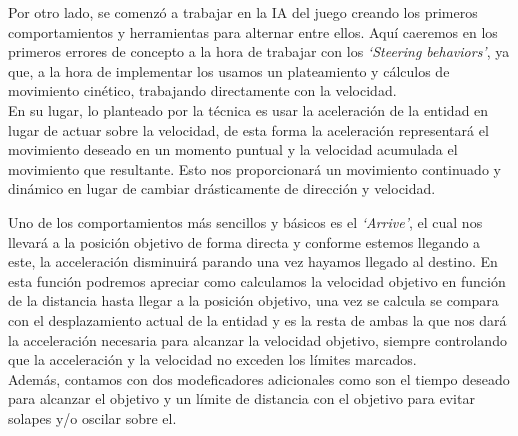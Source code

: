 Por otro lado, se comenzó a trabajar en la \ac{IA} del juego creando los primeros comportamientos
y herramientas para alternar entre ellos. Aquí caeremos en los primeros errores de concepto a la
hora de trabajar con los \textit{`Steering behaviors'}, ya que, a la hora de implementar los
usamos un plateamiento y cálculos de movimiento cinético, trabajando directamente con la 
velocidad.\\
En su lugar, lo planteado por la técnica es usar la aceleración de la entidad en lugar de actuar
sobre la velocidad, de esta forma la aceleración representará el movimiento deseado
en un momento puntual y la velocidad acumulada el movimiento que resultante. Esto nos 
proporcionará un movimiento continuado y dinámico en lugar de cambiar drásticamente de dirección
y velocidad.

Uno de los comportamientos más sencillos y básicos es el \textit{`Arrive'}, el cual nos
llevará a la posición objetivo de forma directa y conforme estemos llegando a este, la 
acceleración disminuirá parando una vez hayamos llegado al destino. En esta función podremos
apreciar como calculamos la velocidad objetivo en función de la distancia hasta llegar a
la posición objetivo, una vez se calcula se compara con el desplazamiento actual de la entidad
y es la resta de ambas la que nos dará la acceleración necesaria para alcanzar la velocidad
objetivo, siempre controlando que la acceleración y la velocidad no exceden los límites 
marcados.\\
Además, contamos con dos modeficadores adicionales como son el tiempo deseado para alcanzar el
objetivo y un límite de distancia con el objetivo para evitar solapes y/o oscilar sobre el.

\newpage

